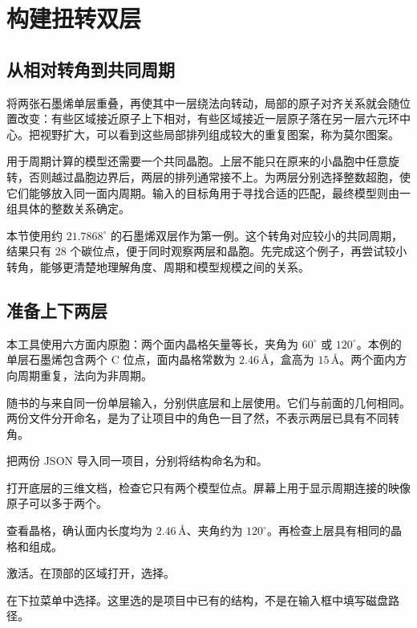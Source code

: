 \section{构建扭转双层}\label{sec:twisted-structures}

\subsection{从相对转角到共同周期}

将两张石墨烯单层重叠，再使其中一层绕法向转动，局部的原子对齐关系就会随位置改变：有些区域接近原子上下相对，有些区域接近一层原子落在另一层六元环中心。把视野扩大，可以看到这些局部排列组成较大的重复图案，称为莫尔图案。

用于周期计算的模型还需要一个共同晶胞。上层不能只在原来的小晶胞中任意旋转，否则越过晶胞边界后，两层的排列通常接不上。为两层分别选择整数超胞，使它们能够放入同一面内周期。输入的目标角用于寻找合适的匹配，最终模型则由一组具体的整数关系确定。

本节使用约 $21.7868^\circ$ 的石墨烯双层作为第一例。这个转角对应较小的共同周期，结果只有 28 个碳位点，便于同时观察两层和晶胞。先完成这个例子，再尝试较小转角，能够更清楚地理解角度、周期和模型规模之间的关系。

\subsection{准备上下两层}

本工具使用六方面内原胞：两个面内晶格矢量等长，夹角为 $60^\circ$ 或 $120^\circ$。本例的单层石墨烯包含两个 C 位点，面内晶格常数为 $2.46\,\text{\AA}$，盒高为 $15\,\text{\AA}$。两个面内方向周期重复，法向为非周期。

随书的与来自同一份单层输入，分别供底层和上层使用。它们与前面的几何相同。两份文件分开命名，是为了让项目中的角色一目了然，不表示两层已具有不同转角。

\begin{steps}
  \item 把两份 JSON 导入同一项目，分别将结构命名为和。
  \item 打开底层的三维文档，检查它只有两个模型位点。屏幕上用于显示周期连接的映像原子可以多于两个。
  \item 查看晶格，确认面内长度均为 $2.46\,\text{\AA}$、夹角约为 $120^\circ$。再检查上层具有相同的晶格和组成。
  \item 激活。在顶部的区域打开，选择。
  \item 在下拉菜单中选择。这里选的是项目中已有的结构，不是在输入框中填写磁盘路径。
\end{steps}

